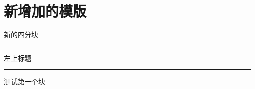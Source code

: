 \documentclass[aspectratio=169]{beamer}
\begin{document}
\section{新增加的模版}

\begin{frame}{新的四分块}
    \begingroup  %
    
    \def\fbtitlefont{\scriptsize}
    \def\fbfont{\tiny}

    \newenvironment{il}{%
    \begingroup
    \let\originalitemcommand\item
    \renewcommand{\item}{\originalitemcommand\fbfont}
    \setbeamertemplate{itemize item}{\fbfont$\bullet$}
    \setbeamertemplate{itemize subitem}{\fbfont$\bullet$}
    \begin{itemize}%
        \setlength{\itemsep}{0pt}%
        \setlength{\parskip}{0pt}%
        \setlength{\leftskip}{-1em}%
    }{%
    \end{itemize}
    \endgroup
    }
    \newenvironment{el}{%
    \begingroup
    \let\originalenumcommand\item
    \renewcommand{\item}{\originalenumcommand\fbfont}
    \begin{enumerate}%
        \setlength{\itemsep}{0pt}%
        \setlength{\parskip}{0pt}%
        \setlength{\leftskip}{-1em}%
    }{%
    \end{enumerate}
    \endgroup
    }

    \begin{columns}[t]
        \begin{column}{0.5\textwidth}
            \begin{minipage}[t]{\linewidth}
                \fbtitlefont
                左上标题\par
                \vspace{-0.5em}
                \textcolor{uestc}{\rule{\linewidth}{0.5pt}}\par
                \vspace{0.5em}
                \fbfont %
                测试第一个块
            \end{minipage}
        

\end{column}
\end{columns}
\end{frame}
\end{document}
